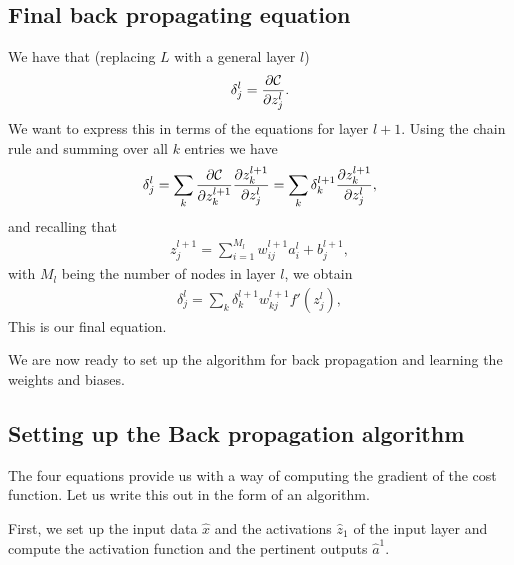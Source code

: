 \documentclass[letterpaper,10pt,english]{sphinxmanual}
\begin{document}
\subsection{Final back propagating equation}
\label{\detokenize{chapter6:final-back-propagating-equation}}
We have that (replacing \(L\) with a general layer \(l\))
\begin{equation*}
\begin{split}
\delta_j^l =\frac{\partial {\cal C}}{\partial z_j^l}.
\end{split}
\end{equation*}
We want to express this in terms of the equations for layer \(l+1\). Using the chain rule and summing over all \(k\) entries we have
\begin{equation*}
\begin{split}
\delta_j^l =\sum_k \frac{\partial {\cal C}}{\partial z_k^{l+1}}\frac{\partial z_k^{l+1}}{\partial z_j^{l}}=\sum_k \delta_k^{l+1}\frac{\partial z_k^{l+1}}{\partial z_j^{l}},
\end{split}
\end{equation*}
and recalling that
\begin{equation*}
\begin{split}
z_j^{l+1} = \sum_{i=1}^{M_{l}}w_{ij}^{l+1}a_i^{l}+b_j^{l+1},
\end{split}
\end{equation*}
with \(M_l\) being the number of nodes in layer \(l\), we obtain
\begin{equation*}
\begin{split}
\delta_j^l =\sum_k \delta_k^{l+1}w_{kj}^{l+1}f'(z_j^l),
\end{split}
\end{equation*}
This is our final equation.

We are now ready to set up the algorithm for back propagation and learning the weights and biases.


\subsection{Setting up the Back propagation algorithm}
\label{\detokenize{chapter6:setting-up-the-back-propagation-algorithm}}
The four equations  provide us with a way of computing the gradient of the cost function. Let us write this out in the form of an algorithm.

First, we set up the input data \(\hat{x}\) and the activations
\(\hat{z}_1\) of the input layer and compute the activation function and
the pertinent outputs \(\hat{a}^1\).
\end{document}
